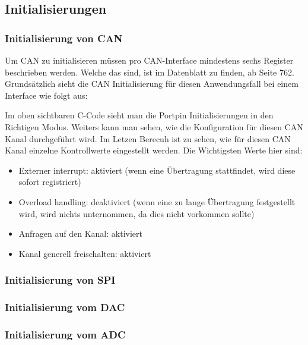 \documentclass[paper=a4, 12pt]{scrreprt}
\begin{document}
		\subsection{Initialisierungen}
		\subsubsection{Initialisierung von CAN}
		Um CAN zu initialisieren müssen pro CAN-Interface mindestens sechs Register beschrieben werden.
		Welche das sind, ist im Datenblatt zu finden, ab Seite 762. 
		Grundsätzlich sieht die CAN Initialisierung für diesen Anwendungsfall bei einem Interface wie folgt aus:
		
		Im oben sichtbaren C-Code sieht man die Portpin Initialisierungen in den Richtigen Modus. Weiters kann man sehen, wie die Konfiguration für diesen CAN Kanal durchgeführt wird. Im Letzen Berecuh ist zu sehen, wie für diesen CAN Kanal einzelne Kontrollwerte eingestellt werden.
		Die Wichtigsten Werte hier sind:
		\begin{itemize}
			\item Externer interrupt: aktiviert (wenn eine Übertragung stattfindet, wird diese sofort registriert)
			\item Overload handling: deaktiviert (wenn eine zu lange Übertragung festgestellt wird, wird nichts unternommen, da dies nicht vorkommen sollte)
			\item Anfragen auf den Kanal: aktiviert
			\item Kanal generell freischalten: aktiviert
		\end{itemize} 
		\newpage
		\subsubsection{Initialisierung von SPI}
		
		\subsubsection{Initialisierung vom DAC}
		
		\newpage
		\subsubsection{Initialisierung vom ADC}
		
		\newpage 
		
\end{document}

